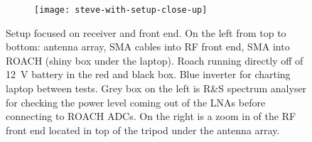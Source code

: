 \begin{figure}
  \centering
  \begin{subfigure}{0.8\textwidth}
    \texttt{[image: steve-with-setup-close-up]}
  \end{subfigure}
  \caption{Setup focused on receiver and front end. On the left from top to bottom: antenna array, SMA cables into RF front end, SMA into ROACH (shiny box under the laptop). Roach running directly off of \SI{12}{\volt} battery in the red and black box. Blue inverter for charting laptop between tests. Grey box on the left is R\&S spectrum analyser for checking the power level coming out of the LNAs before connecting to ROACH ADCs.  On the right is a zoom in of the RF front end located in top of the tripod under the antenna array.}
\end{figure}
